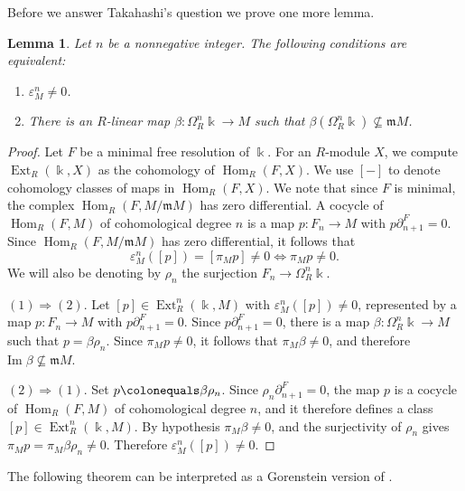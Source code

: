 \documentclass{amsart}
\newtheorem{lemma}[theorem]{Lemma}
\theoremstyle{definition}
\theoremstyle{definition}
\theoremstyle{remark}
\numberwithin{equation}{section}
\newcommand{\kk}{\Bbbk}
\newcommand{\Ext}{\operatorname{Ext}}
\newcommand{\Hom}{\operatorname{Hom}}
\newcommand{\m}{\mathfrak{m}}
\begin{document}
Before we answer Takahashi's question we prove one more lemma.

\begin{lemma}\label{lem:epsilon}
Let $n$ be a nonnegative integer. The following conditions are equivalent:
\begin{enumerate}
\item $\varepsilon_M^n\neq0$.
\item There is an $R$-linear map $\beta:\Omega_R^n\kk\rightarrow M$ such that $\beta(\Omega_R^n\kk)\not\subseteq\m M$.
\end{enumerate}
\end{lemma}
\begin{proof}
Let $F$ be a minimal free resolution of $\kk$. For an $R$-module $X$, we compute $\Ext_R(\kk,X)$ as the cohomology of $\Hom_R(F,X)$. We use $[-]$ to denote cohomology classes of maps in $\Hom_R(F,X)$. We note that since $F$ is minimal, the complex $\Hom_R(F,M/\m M)$ has zero differential. A cocycle of $\Hom_R(F,M)$ of cohomological degree $n$ is a map $p:F_n\rightarrow M$ with $p\partial^F_{n+1}=0$. Since $\Hom_R(F,M/\m M)$ has zero differential, it follows that
\[
\varepsilon_M^n([p])=[\pi_Mp]\neq0\Longleftrightarrow\pi_M p\neq0.
\]
We will also be denoting by $\rho_n$ the surjection $F_n\rightarrow\Omega_R^n\kk$.

$(1)\Rightarrow(2)$. Let $[p]\in\Ext_R^n(\kk,M)$ with $\varepsilon_M^n([p])\neq0$, represented by a map $p:F_n\rightarrow M$ with $p\partial^F_{n+1}=0$. Since $p\partial^F_{n+1}=0$, there is a map $\beta:\Omega_R^n\kk\rightarrow M$ such that $p=\beta\rho_n$. Since $\pi_Mp\neq0$, it follows that $\pi_M\beta\neq0$, and therefore $\mathrm{Im}\;\beta\not\subseteq \m M$.

$(2)\Rightarrow(1)$. Set $p\colonequals\beta\rho_n$. Since $\rho_n\partial_{n+1}^F=0$, the map $p$ is a cocycle of $\Hom_R(F,M)$ of cohomological degree $n$, and it therefore defines a class $[p]\in\Ext_R^n(\kk,M)$. By hypothesis $\pi_M\beta\neq0$, and the surjectivity of $\rho_n$ gives $\pi_Mp=\pi_M\beta\rho_n\neq0$. Therefore $\varepsilon_M^n([p])\neq0$.
\end{proof}

The following theorem can be interpreted as a Gorenstein version of \cite[Corollary 9]{extremal}.
\end{document}
